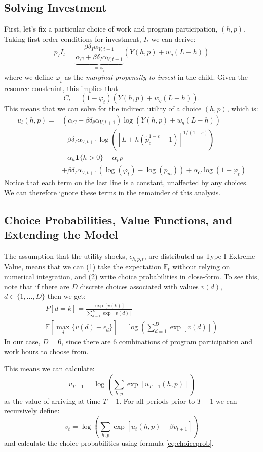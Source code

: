 \documentclass[12pt]{article}
\newcommand\EE{\mathbb{E}}
\newcommand\eps{\epsilon}
\numberwithin{equation}{section}
\numberwithin{figure}{section}
\numberwithin{table}{section}
\begin{document}
\subsection{Solving Investment}
First, let's fix a particular choice of work and program participation, $(h,p)$. Taking first order conditions for investment, $I_t$ we can derive:
\[p_II_t = \underbrace{\frac{\beta\delta_I\alpha_{V,t+1}}{\alpha_C+\beta\delta_I\alpha_{V,t+1}}}_{ = \varphi_{t}}\left(Y(h,p) + w_q(L-h)\right) \]
where we define $\varphi_{t}$ as the \emph{marginal propensity to invest} in the child. Given the resource constraint, this implies that
\[C_t = (1-\varphi_t)(Y(h,p)+w_q(L-h)) .\]
This means that we can solve for the indirect utility of a choice $(h,p)$, which is:
\begin{align*}
u_t(h,p) =& (\alpha_C+\beta\delta_{\theta}\alpha_{V,t+1})\log(Y(h,p)+w_q(L-h)) \\
& - \beta\delta_{I}\alpha_{V,t+1}\log\left([L + h(\tilde{p}_c^{1-\varepsilon}-1)]^{1/(1-\varepsilon)}\right) \\
& - \alpha_h\mathbf{1}\{h>0\} - \alpha_pp \\
& + \beta\delta_I\alpha_{V,t+1}(\log(\varphi_t) - \log(p_m)) + \alpha_C\log(1-\varphi_t)
\end{align*}
Notice that each term on the last line is a constant, unaffected by any choices. We can therefore ignore these terms in the remainder of this analysis.

\subsection{Choice Probabilities, Value Functions, and Extending the Model}
The assumption that the utility shocks, $\eps_{h,p,t}$, are distributed as Type I Extreme Value, means that we can (1) take the expectation $\mathbb{E}_t$ without relying on numerical integration, and (2) write choice probabilities in close-form. To see this, note that if there are $D$ discrete choices associated with values $v(d)$, $d\in\{1,...,D\}$ then we get:
\begin{eqnarray}
P[d=k] = \frac{\exp[v(k)]}{\sum_{d=1}^D\exp[v(d)]} \label{eq:choiceprob} \\
\EE\left[\max_{d}\{v(d)+\eps_d\}\right] = \log\left(\sum_{d=1}^D\exp[v(d)]\right)
\end{eqnarray}
In our case, $D=6$, since there are 6 combinations of program participation and work hours to choose from.

This means we can calculate:
\[v_{T-1} = \log\left(\sum_{h,p}\exp[u_{T-1}(h,p)]\right)\]
as the value of arriving at time $T-1$. For all periods prior to $T-1$ we can recursively define:
\[v_t = \log\left(\sum_{h,p}\exp[u_{t}(h,p) + \beta v_{t+1}]\right)\]
and calculate the choice probabilities using formula \eqref{eq:choiceprob}.
\end{document}
